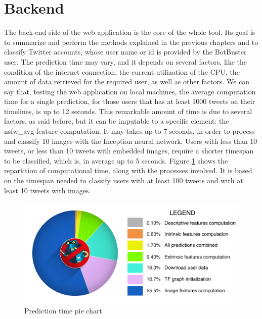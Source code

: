 \section{Backend}
The back-end side of the web application is the core of the whole tool. Its goal is to summarize and perform the methods explained in the previous chapters and to classify Twitter accounts, whose user name or id is provided by the BotBuster user.
The prediction time may vary, and it depends on several factors, like the condition of the internet connection, the current utilization of the CPU, the amount of data retrieved for the required user, as well as other factors.
We can say that, testing the web application on local machines, the average computation time for a single prediction, for those users that has at least 1000 tweets on their timelines, is up to 12 seconds. This remarkable amount of time is due to several factors, as said before, but it can be imputable to a specific element: the nsfw\_avg feature computation. It may takes up to 7 seconds, in order to process and classify 10 images with the Inception neural network. Users with less than 10 tweets, or less than 10 tweets with embedded images, require a shorter timespan to be classified, which is, in average up to 5 seconds. Figure \ref{fig:pie} shows the repartition of computational time, along with the processes involved. It is based on the timespan needed to classify users with at least 100 tweets and with at least 10 tweets with images.

\begin{figure}[htp!]
	\begin{center}
		\includegraphics[width=\columnwidth]{chapter7/figure/time-pie.png}
	\end{center}
	\caption{Prediction time pie chart}
	\label{fig:pie}
\end{figure}

